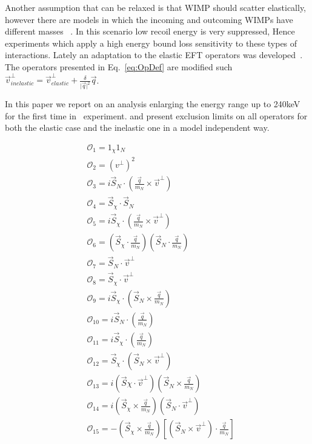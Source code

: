 	    Another assumption that can be relaxed is that WIMP should scatter elastically, however there are models in which the incoming and outcoming WIMPs have different masses ~\cite{InelasticIntro}. In this scenario low recoil energy is very suppressed, Hence experiments which apply a high energy bound loss sensitivity to these types of interactions. Lately an adaptation to the elastic EFT operators was developed~\cite{InelasticMath}. The operators presented in Eq.~\ref{eq:OpDef} are modified such $\vec{v}^\perp_{inelastic} = \vec{v}^\perp_{elastic} +\frac{\delta}{\vert{\vec{q}}\vert^2}\vec{q}$.      
	    
	    In this paper we report on an analysis enlarging the energy range up to 240keV for the first time in \Xehund\ experiment. and present exclusion limits on all operators for both the elastic case and the inelastic one in a model independent way.     

\begin{equation} \label{eq:OpDef}
\begin{split}
&\mathcal{O}_1 = 1_{\chi} 1_N  \\
&\mathcal{O}_2 = (v^{\perp})^2 \\
&\mathcal{O}_3 = i\vec{S}_N\cdot (\frac{\vec{q}}{m_N}\times\vec{v}^\perp) \\
&\mathcal{O}_4 = \vec{S}_{\chi}\cdot \vec{S}_N \\
&\mathcal{O}_5 = i\vec{S}_{\chi}\cdot (\frac{\vec{q}}{m_N}\times\vec{v}^\perp) \\
&\mathcal{O}_6 = (\vec{S}_{\chi} \cdot \frac{\vec{q}}{m_N})(\vec{S}_N \cdot \frac{\vec{q}}{m_N}) \\
&\mathcal{O}_7 = \vec{S}_N \cdot \vec{v}^\perp \\
&\mathcal{O}_8 = \vec{S}_{\chi} \cdot \vec{v}^\perp \\
&\mathcal{O}_9 = i\vec{S}_{\chi} \cdot(\vec{S}_N \times \frac{\vec{q}}{m_N}) \\
&\mathcal{O}_{10} = i\vec{S}_N \cdot (\frac{\vec{q}}{m_N}) \\
&\mathcal{O}_{11} = i\vec{S}_{\chi} \cdot (\frac{\vec{q}}{m_N}) \\
&\mathcal{O}_{12} = \vec{S}_\chi \cdot (\vec{S}_N \times \vec{v}^\perp) \\
&\mathcal{O}_{13} = i(\vec{S}\chi \cdot \vec{v}^\perp)(\vec{S}_N \times \frac{\vec{q}}{m_N})\\
&\mathcal{O}_{14} = i(\vec{S}_\chi \times \frac{\vec{q}}{m_N})(\vec{S}_N \cdot \vec{v}^\perp) \\
&\mathcal{O}_{15} = -(\vec{S}_\chi \times \frac{\vec{q}}{m_N})[(\vec{S}_N \times \vec{v}^\perp)\cdot \frac{\vec{q}}{m_N}]
\end{split}
\end{equation}
	        	       

